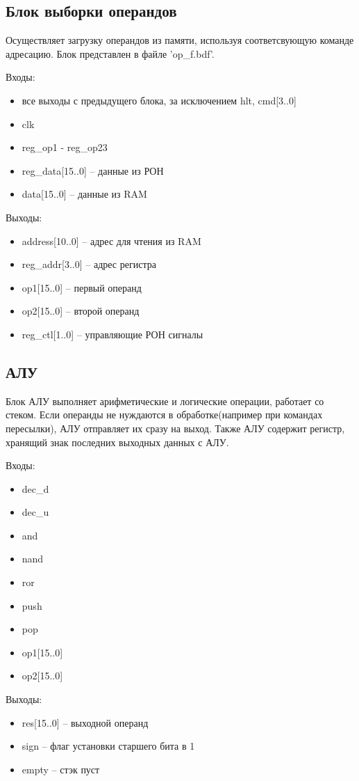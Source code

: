 \subsection{Блок выборки операндов}
Осуществляет загрузку операндов из памяти, используя соответсвующую команде адресацию. Блок представлен в файле 'op\_f.bdf'.

Входы:
\begin{itemize}
    \item все выходы с предыдущего блока, за исключением hlt, cmd[3..0]
    \item clk
    \item reg\_op1 - reg\_op23
    \item reg\_data[15..0] -- данные из РОН
    \item data[15..0] -- данные из RAM
\end{itemize}
Выходы:
\begin{itemize}
    \item address[10..0] -- адрес для чтения из RAM
    \item reg\_addr[3..0] -- адрес регистра
    \item op1[15..0] -- первый операнд
    \item op2[15..0] -- второй операнд
    \item reg\_ctl[1..0] -- управляющие РОН сигналы
\end{itemize}

\subsection{АЛУ}
Блок АЛУ выполняет арифметические и логические операции, работает со стеком. Если операнды не нуждаются в обработке(например при командах пересылки), АЛУ отправляет их сразу на выход. Также АЛУ содержит регистр, хранящий знак последних выходных данных с АЛУ.

Входы:
\begin{itemize}
    \item dec\_d
    \item dec\_u
    \item and
    \item nand
    \item ror
    \item push
    \item pop
    \item op1[15..0]
    \item op2[15..0]
\end{itemize}
Выходы:
\begin{itemize}
    \item res[15..0] -- выходной операнд
    \item sign -- флаг установки старшего бита в 1
    \item empty -- стэк пуст
\end{itemize}

